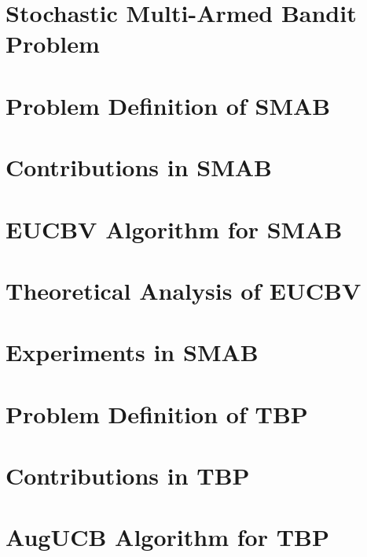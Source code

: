 \documentclass{beamer}
\begin{document}
\section{Stochastic Multi-Armed Bandit Problem}


\section{Problem Definition of SMAB}


\section{Contributions in SMAB}


\section{EUCBV Algorithm for SMAB}


\section{Theoretical Analysis of EUCBV}


\section{Experiments in SMAB}






\section{Problem Definition of TBP}



\section{Contributions in TBP}


%

\section{AugUCB Algorithm for TBP}

\end{document}
